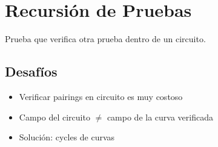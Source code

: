 \documentclass[11pt,a4paper,twoside]{book}
\begin{document}
\section{Recursi\'on de Pruebas}

\begin{definition}
Prueba que verifica otra prueba dentro de un circuito.
\end{definition}

\subsection{Desaf\'ios}

\begin{itemize}
    \item Verificar pairings en circuito es muy costoso
    \item Campo del circuito $\neq$ campo de la curva verificada
    \item Soluci\'on: cycles de curvas
\end{itemize}
\end{document}
